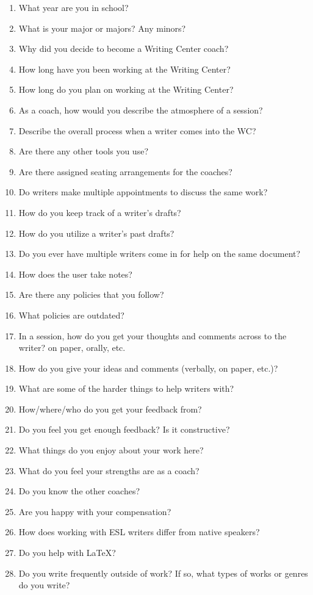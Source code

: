 \documentclass[12pt]{article} %
\begin{document}
\begin{enumerate} \itemsep1pt \parskip0pt 
	\item What year are you in school?
	\item What is your major or majors?  Any minors?
	\item Why did you decide to become a Writing Center coach?
	\item How long have you been working at the Writing Center?
	\item How long do you plan on working at the Writing Center?
	\item As a coach, how would you describe the atmosphere of a session?
	\item Describe the overall process when a writer comes into the WC?
	\item Are there any other tools you use?
	\item Are there assigned seating arrangements for the coaches?
	\item Do writers make multiple appointments to discuss the same work?
	\item How do you keep track of a writer’s drafts?
	\item How do you utilize a writer’s past drafts?
	\item Do you ever have multiple writers come in for help on the same document?
	\item How does the user take notes?
	\item Are there any policies that you follow? 
	\item What policies are outdated?  
	\item In a session, how do you get your thoughts and comments across to the writer? {on paper, orally, etc.}
	\item How do you give your ideas and comments (verbally, on paper, etc.)?
	\item What are some of the harder things to help writers with?
	\item How/where/who do you get your feedback from?
	\item Do you feel you get enough feedback? Is it constructive?
	\item What things do you enjoy about your work here?
	\item What do you feel your strengths are as a coach?
	\item Do you know the other coaches?
	\item Are you happy with your compensation?
	\item How does working with ESL writers differ from native speakers?
	\item Do you help with LaTeX?
	\item Do you write frequently outside of work?  If so, what types of works or genres do you write?
\end{enumerate}
\end{document}
